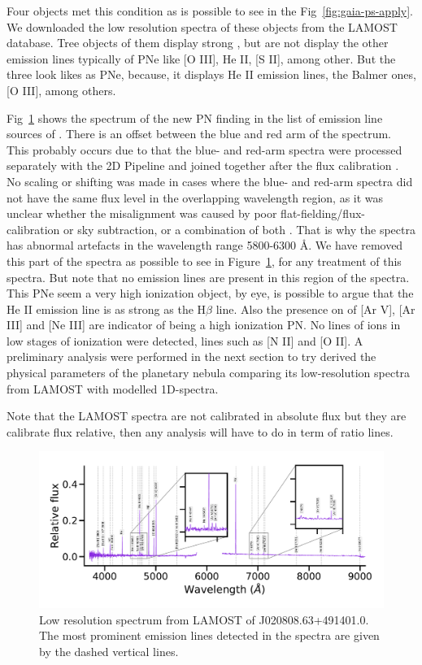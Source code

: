 \documentclass[fleqn,usenatbib]{mnras}
\begin{document}
Four objects met this  condition as is possible to see in the Fig~\ref{fig:gaia-ps-apply}.
We downloaded the low resolution spectra of these objects from the LAMOST database. 
Tree objects of them display strong \ha{}, but are not display the other emission
lines typically of PNe like [O III], He II, [S II], among other. But the three look likes as PNe,
because, it displays He II emission lines, the Balmer ones, [O III], among others.

Fig~\ref{fig:spectra} shows the spectrum of the new PN finding in the list of emission
line sources of \citet{Skoda:2020}. There is an offset between the blue and red arm of
the spectrum. This probably occurs due to that the blue- and red-arm spectra were
processed separately with the 2D Pipeline and joined together after the ﬂux calibration
\citep{Xiang:2015}. No scaling or shifting was made in cases where the blue- and
red-arm spectra did not have the same ﬂux level in the overlapping wavelength region,
as it was unclear whether the misalignment was caused by poor ﬂat-ﬁelding/flux-calibration
or sky subtraction, or a combination of both \citep{Chen:2016}. That is why the spectra has
abnormal artefacts in the wavelength range 5800-6300 \AA. We have removed this part of
the spectra as possible to see in Figure~\ref{fig:spectra}, for any treatment of
this spectra. But note that no emission lines are present in this region of the spectra.
This PNe seem a very high ionization object, by eye, is possible to argue
that the He II emission line is as strong as the H$\beta$ line.
Also the presence on of [Ar V], [Ar III] and [Ne III] are indicator of being a high
ionization PN. No lines of ions in low stages of ionization were detected,
lines such as [N II] and [O II]. A preliminary analysis were performed in the next
section to try derived the physical parameters of the planetary nebula comparing
its low-resolution spectra from LAMOST with modelled 1D-spectra.

Note that the LAMOST spectra are not calibrated in absolute flux but they are
calibrate flux relative, then any analysis will have to do in term of ratio lines. 

\begin{figure}
\centering
  \includegraphics[width=\linewidth]{Figs/spec-56581-VB031N50V1_sp08-218.pdf}
  \caption{Low resolution spectrum from LAMOST of J020808.63+491401.0.
    The most prominent emission lines detected in the spectra are given by the dashed vertical
    lines.} 
  \label{fig:spectra}
\end{figure}
\end{document}
